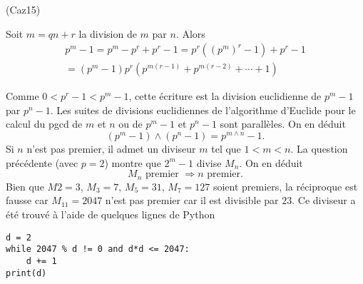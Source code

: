 \begin{tiny}(Caz15)\end{tiny} Soit $m = qn +r$ la division de $m$ par $n$. Alors
\begin{multline*}
p^m - 1 = p^m - p^r + p^r -1
= p^r\left( (p^m)^r - 1 \right) + p^r - 1 \\
= (p^m-1)p^r\left( p^{m(r-1)} + p^{m(r-2)} + \cdots + 1\right) 
\end{multline*}

Comme $0 < p^r - 1 < p^m -1$, cette écriture est la division euclidienne de $p^m -1$ par $p^n -1$. Les suites de divisions euclidiennes de l'algorithme d'Euclide pour le calcul du pgcd de $m$ et $n$ ou de $p^m-1$ et $p^n-1$ sont parallèles. On en déduit
\[
 (p^m - 1)\wedge (p^n - 1) = p^{m \wedge n} - 1.
\]
Si $n$ n'est pas premier, il admet un diviseur $m$ tel que $1 < m < n$. La question précédente (avec $p=2$) montre que $2^m - 1$ divise $M_n$. On en déduit 
\[
 M_n \text{ premier } \Rightarrow n \text{ premier}.
\]
Bien que $M2 =3$, $M_3 = 7$, $M_5 = 31$, $M_7 = 127$ soient premiers, la réciproque est fausse car $M_{11} = 2047$ n'est pas premier car il est divisible par $23$. Ce diviseur a été trouvé à l'aide de quelques lignes de Python
\begin{verbatim}
d = 2
while 2047 % d != 0 and d*d <= 2047:
    d += 1
print(d)
\end{verbatim} 

